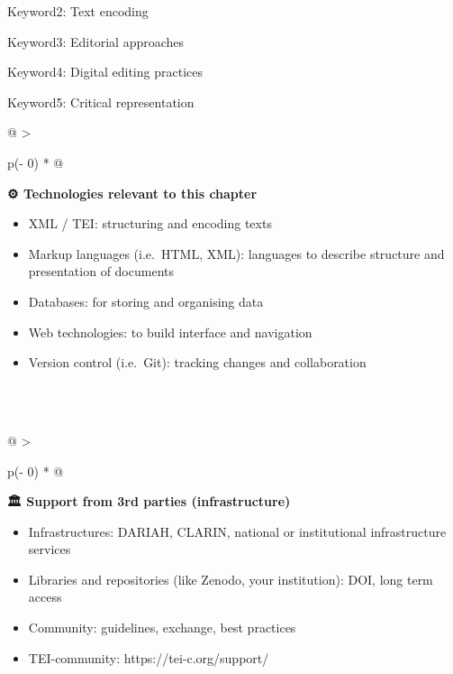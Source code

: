 \documentclass[
  letterpaper,
  DIV=11,
  numbers=noendperiod]{scrreprt}
\providecommand{\tightlist}{%
  \setlength{\itemsep}{0pt}\setlength{\parskip}{0pt}}\usepackage{longtable,booktabs,array}
\begin{document}
Keyword2: Text encoding

Keyword3: Editorial approaches

Keyword4: Digital editing practices

Keyword5: Critical representation

\begin{longtable}[]{@{}
  >{\raggedright\arraybackslash}p{(\columnwidth - 0\tabcolsep) * }@{}}
\toprule\noalign{}
\begin{minipage}[b]{\linewidth}\raggedright
\textbf{⚙️ Technologies relevant to this chapter} \textbar{}

\begin{itemize}
\item
  XML / TEI: structuring and encoding texts
\item
  Markup languages (i.e.~HTML, XML): languages to describe structure and
  presentation of documents
\item
  Databases: for storing and organising data
\item
  Web technologies: to build interface and navigation
\item
  Version control (i.e.~Git): tracking changes and collaboration
\end{itemize}
\end{minipage} \\
\midrule\noalign{}
\endhead
\bottomrule\noalign{}
\endlastfoot
 \\
\end{longtable}

\begin{longtable}[]{@{}
  >{\raggedright\arraybackslash}p{(\columnwidth - 0\tabcolsep) * }@{}}
\toprule\noalign{}
\begin{minipage}[b]{\linewidth}\raggedright
\textbf{🏛️ Support from 3rd parties (infrastructure)} \textbar{}

\begin{itemize}
\item
  Infrastructures: DARIAH, CLARIN, national or institutional
  infrastructure services
\item
  Libraries and repositories (like Zenodo, your institution): DOI, long
  term access
\item
  Community: guidelines, exchange, best practices
\end{itemize}

\begin{itemize}
\tightlist
\item
  TEI-community: https://tei-c.org/support/
\end{itemize}
\end{minipage} \\
\midrule\noalign{}
\endhead
\bottomrule\noalign{}
\endlastfoot
 \\
\end{longtable}
\end{document}
